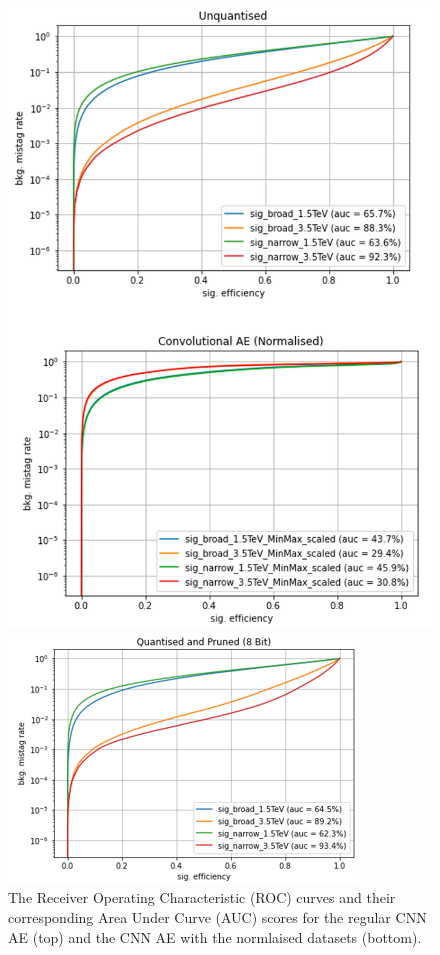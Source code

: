 \documentclass[a4paper]{article}
\theoremstyle{plain}
\theoremstyle{definition}
\begin{document}
			\begin{figure}[H]
				\centering
					\begin{minipage}[c]{0.45\linewidth}
						\centering
						\includegraphics[width=\textwidth]{cnn-roc.png}
						\caption{The Receiver Operating Characteristic (ROC) curves and their corresponding Area Under Curve (AUC) scores for the regular CNN AE (top) and the CNN AE with the normlaised datasets (bottom).}
						\label{fig:cnn-roc}
					\end{minipage}
				\hfill
					\begin{minipage}[c]{0.45\linewidth}
						\centering
						\includegraphics[width=\textwidth]{cnn-compressed-roc.png}

\end{minipage}
\end{figure}
\end{document}
